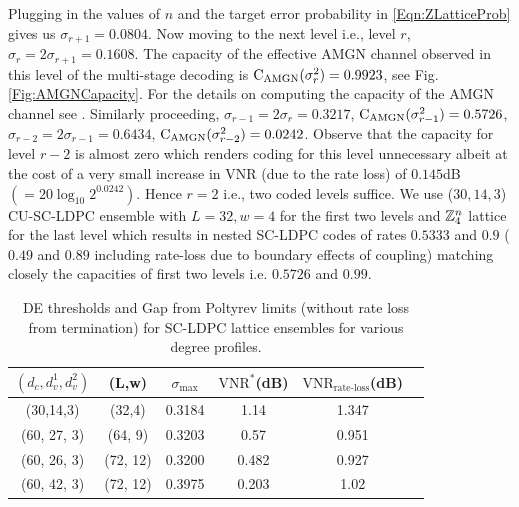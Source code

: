 Plugging in the values of $n$ and the target error probability in \eqref{Eqn:ZLatticeProb} gives us $\sigma_{r+1}= 0.0804$. Now moving to the next level i.e., level $r$, $\sigma_{r}=2\sigma_{r+1}=0.1608$. The capacity of the effective AMGN channel observed in this level of the multi-stage decoding is $\text{C}_{\text{AMGN}}(\sigma^{2}_{r})=0.9923$, see Fig. \ref{Fig:AMGNCapacity}. For the details on computing the capacity of the AMGN channel see \cite{forney2000}.  Similarly proceeding, $\sigma_{r-1}=2\sigma_{r}=0.3217$, $\text{C}_{\text{AMGN}}(\sigma^{2}_{r-1})=0.5726$, $\sigma_{r-2}=2\sigma_{r-1}=0.6434$, $\text{C}_{\text{AMGN}}(\sigma^{2}_{r-2})=0.0242$. Observe that the capacity for level $r-2$ is almost zero which renders coding for this level unnecessary albeit at the cost of a very small increase in VNR (due to the rate loss) of $0.145$dB $(=20\log_{10}2^{0.0242})$. Hence $r=2$ i.e., two coded levels suffice. We use ($30,14,3$) CU-SC-LDPC ensemble with $L=32, w=4$ for the first two levels and $\mathbb{Z}_{4}^{n}$ lattice for the last level which results in nested SC-LDPC codes of rates $0.5333$ and $0.9$ ($0.49$ and $0.89$ including rate-loss due to boundary effects of coupling) matching closely the capacities of first two levels i.e. $0.5726$ and $0.99$.
\begin{table}
\centering
\caption{DE thresholds and Gap from Poltyrev limits (without rate loss from termination) for SC-LDPC lattice ensembles for various degree profiles.}
\begin{tabular}{c c c c c c}
\hline  \hline
$(d_{c},d_{v}^{1},d_{v}^{2})$ &(L,w)& $\sigma_{\text{max}}$ &$\text{VNR}^{*}$(dB) &$\text{VNR}_{\text{rate-loss}}$(dB)\\
\hline
(30,14,3) & (32,4) & 0.3184 & 1.14 & 1.347\\
(60, 27, 3)& (64, 9)  &  0.3203 & 0.57 & 0.951 \\
(60, 26, 3)& (72, 12) & 0.3200 &0.482 & 0.927\\
(60, 42, 3)& (72, 12) & 0.3975 & 0.203 &1.02\\
\end{tabular}
\label{Table:Thresholds}
\end{table}

